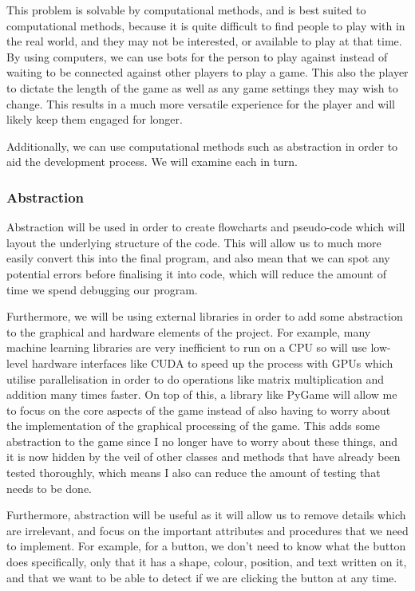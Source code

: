 \vs
This problem is solvable by computational methods, and is best suited to computational methods, because it is quite difficult to find people to play with in the real world, and they may not be interested, or available to play at that time. By using computers, we can use bots for the person to play against instead of waiting to be connected against other players to play a game. This also the player to dictate the length of the game as well as any game settings they may wish to change. This results in a much more versatile experience for the player and will likely keep them engaged for longer.

\vs
Additionally, we can use computational methods such as abstraction in order to aid the development process. We will examine each in turn.
\vs

\subsubsection{Abstraction}

Abstraction will be used in order to create flowcharts and pseudo-code which will layout the underlying structure of the code. This will allow us to much more easily convert this into the final program, and also mean that we can spot any potential errors before finalising it into code, which will reduce the amount of time we spend debugging our program.

\vs
Furthermore, we will be using external libraries in order to add some abstraction to the graphical and hardware elements of the project. For example, many machine learning libraries are very inefficient to run on a CPU so will use low-level hardware interfaces like CUDA to speed up the process with GPUs which utilise parallelisation in order to do operations like matrix multiplication and addition many times faster. On top of this, a library like PyGame will allow me to focus on the core aspects of the game instead of also having to worry about the implementation of the graphical processing of the game. This adds some abstraction to the game since I no longer have to worry about these things, and it is now hidden by the veil of other classes and methods that have already been tested thoroughly, which means I also can reduce the amount of testing that needs to be done.
\vs

Furthermore, abstraction will be useful as it will allow us to remove details which are irrelevant, and focus on the important attributes and procedures that we need to implement. For example, for a button, we don't need to know what the button does specifically, only that it has a shape, colour, position, and text written on it, and that we want to be able to detect if we are clicking the button at any time.


